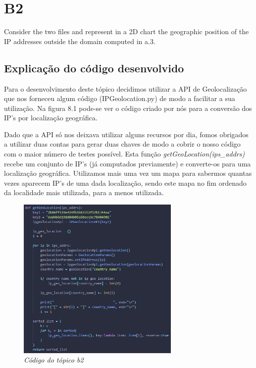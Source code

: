 \chapter{B2}

{\LARGE Consider the two files and represent in a 2D chart the geographic position of the IP addresses outside the domain computed in a.3.}

\section{Explicação do código desenvolvido}

Para o desenvolvimento deste tópico decidimos utilizar a API de Geolocalização \cite{API} que nos forneceu algum código (IPGeolocation.py) de modo a facilitar a sua utilização. Na figura 8.1 pode-se ver o código criado por nós para a conversão dos IP's por localização geográfica. 

Dado que a API só nos deixava utilizar alguns recursos por dia, fomos obrigados a utilizar duas contas para gerar duas chaves de modo a cobrir o nosso código com o maior número de testes possível. Esta função \textit{getGeoLocation(ips\_addrs)} recebe um conjunto de IP's (já computados previamente) e converte-os para uma localização geográfica. Utilizamos mais uma vez um mapa para sabermos quantas vezes aparecem IP's de uma dada localização, sendo este mapa no fim ordenado da localidade mais utilizada, para a menos utilizada.


\begin{figure}[h!]
    \label{high}
    \centering
    \includegraphics[width=0.7\textwidth]{Images/b2/getGeoLocation.png}
    \caption{\textit{Código do tópico b2}}
\end{figure}

